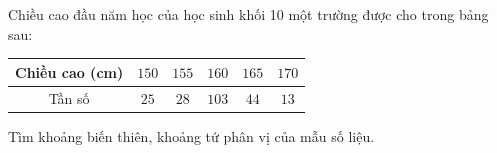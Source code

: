 \begin{ex}
Chiều cao đầu năm học của học sinh khối 10 một trường được cho trong bảng sau:
\begin{center}
\begin{tabular}{|c|c|c|c|c|c|}\hline
Chiều cao (cm) & $150$ & $155$ & $160$ & $165$ & $170$\\\hline
Tần số & $25$ & $28$ & $103$ & $44$ & $13$\\\hline
\end{tabular}
\end{center}
Tìm khoảng biến thiên, khoảng tứ phân vị của mẫu số liệu.
\end{ex}
